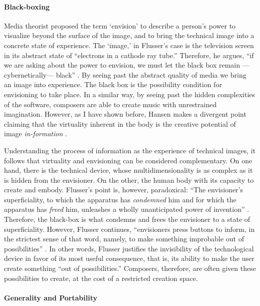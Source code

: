 	\paragraph{Black-boxing}

	Media theorist \textcite{Flu11:Int} proposed the term `envision' to describe a person's power to visualize beyond the surface of the image, and to bring the technical image into a concrete state of experience. The `image,' in Flusser's case is the television screen in its abstract state of ``electrons in a cathode ray tube.'' Therefore, he argues, ``if we are asking about the power to envision, we must let the black box remain ---cybernetically--- black'' \parencite[35]{Flu11:Int}. By seeing past the abstract quality of media we bring an image into experience. The black box is the possibility condition for envisioning to take place. In a similar way, by seeing past the hidden complexities of the software, composers are able to create music with unrestrained imagination. However, as I have shown before, Hansen makes a divergent point claiming that the virtuality inherent in the body is the creative potential of image \textit{in-formation} . 

	Understanding the process of information as the experience of technical images, it follows that virtuality and envisioning can be considered complementary. On one hand, there is the technical device, whose multidimensionality is as complex as it is hidden from the envisioner. On the other, the human body with its capacity to create and embody. Flusser's point is, however, paradoxical: ``The envisioner's superficiality, to which the apparatus has \textit{condemned} him and for which the apparatus has \textit{freed} him, unleashes a wholly unanticipated power of invention'' \im \parencite[37]{Flu11:Int}. Therefore, the black-box is what condemns and frees the envisioner to a state of superficiality. However, Flusser continues, ``envisioners press buttons to inform, in the strictest sense of that word, namely, to make something improbable out of possibilities'' \parencite[37]{Flu11:Int}. In other words, Flusser justifies the invisibility of the technological device in favor of its most useful consequence, that is, its ability to make the user create something ``out of possibilities.'' Composers, therefore, are often given these possibilities to create, at the cost of a restricted creation space.

	\paragraph{Generality and Portability}
	\label{computer:free}

